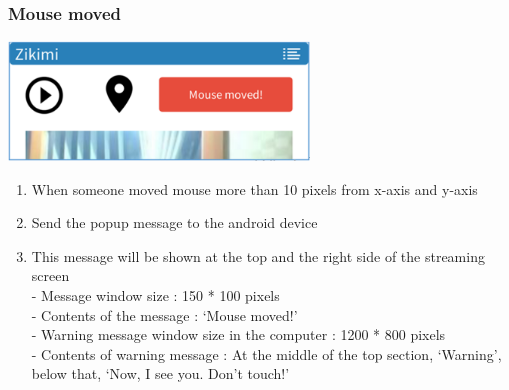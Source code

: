 \documentclass[12pt]{article}
\begin{document}
\subsubsection{Mouse moved}
\begin{center} 
\includegraphics[width=80mm,scale=1.2]{mousemoved}
\end{center}
\begin{enumerate}
\item When someone moved mouse more than 10 pixels from x-axis and y-axis\\
\item Send the popup message to the android device\\
\item This message will be shown at the top and the right side of the streaming screen\\
 - Message window size : 150 * 100 pixels\\
 - Contents of the message : ‘Mouse moved!’\\
 - Warning message window size in the computer : 1200 * 800 pixels\\
- Contents of warning message : At the middle of the top section, ‘Warning’, below that, ‘Now, I see you. Don’t touch!’\\
\end{enumerate}

\end{document}
